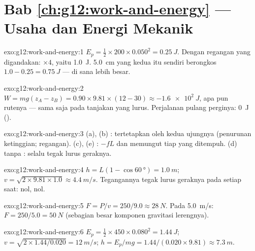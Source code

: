 \section*{Bab \ref{ch:g12:work-and-energy} --- Usaha dan Energi Mekanik}

\begin{solution}{exo:g12:work-and-energy:1}
$E_p = \tfrac12 \times 200 \times 0.050^2 = \qty{0.25}{J}$. Dengan regangan
yang digandakan: $\times 4$, yaitu \qty{1.0}{J}. \qty{5.0}{cm} yang kedua itu
sendiri berongkos $1.0 - 0.25 = \qty{0.75}{J}$ ---  di sana lebih besar.
\end{solution}

\begin{solution}{exo:g12:work-and-energy:2}
$W = mg(z_A - z_B) = 0.90 \times 9.81 \times (12 - 30) \approx
\qty{-1.6e2}{J}$, apa pun rutenya --- sama saja pada tanjakan yang
lurus. Perjalanan pulang perginya: \qty{0}{J} ().
\end{solution}

\begin{solution}{exo:g12:work-and-energy:3}
(a), (b) :  tertetapkan oleh kedua ujungnya (penurunan
ketinggian; regangan). (c), (e) : $-fL$ dan  memungut
tiap  yang ditempuh. (d) tanpa : selalu tegak lurus geraknya.
\end{solution}

\begin{solution}{exo:g12:work-and-energy:4}
$h = L(1 - \cos\qty{60}{\degree}) = \qty{1.0}{m}$;
$v = \sqrt{2 \times 9.81 \times 1.0} \approx \qty{4.4}{m/s}$.
Tegangannya tegak lurus geraknya pada setiap saat:  nol,
 nol.
\end{solution}

\begin{solution}{exo:g12:work-and-energy:5}
$F = P/v = 250/9.0 \approx \qty{28}{N}$. Pada \qty{5.0}{m/s}:
$F = 250/5.0 = \qty{50}{N}$ (sebagian besar komponen gravitasi lerengnya).
\end{solution}

\begin{solution}{exo:g12:work-and-energy:6}
$E_p = \tfrac12 \times 450 \times 0.080^2 = \qty{1.44}{J}$;
$v = \sqrt{2 \times 1.44/0.020} = \qty{12}{m/s}$;
$h = E_p/mg = 1.44/(0.020 \times 9.81) \approx \qty{7.3}{m}$.
\end{solution}

